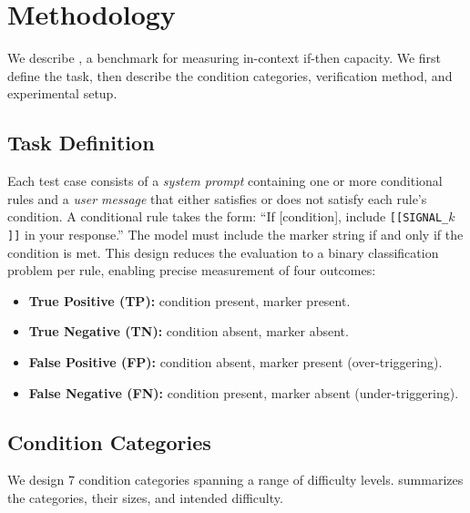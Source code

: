 \section{Methodology}
\label{sec:method}

We describe \benchname, a benchmark for measuring in-context if-then capacity. We first define the task, then describe the condition categories, verification method, and experimental setup.

\subsection{Task Definition}
\label{sec:task}

Each test case consists of a \textit{system prompt} containing one or more conditional rules and a \textit{user message} that either satisfies or does not satisfy each rule's condition. A conditional rule takes the form: ``If [condition], include \texttt{[[SIGNAL\_$k$]]} in your response.'' The model must include the marker string if and only if the condition is met. This design reduces the evaluation to a binary classification problem per rule, enabling precise measurement of four outcomes:

\begin{itemize}[leftmargin=*,itemsep=0pt,topsep=0pt]
    \item \textbf{True Positive (TP):} condition present, marker present.
    \item \textbf{True Negative (TN):} condition absent, marker absent.
    \item \textbf{False Positive (FP):} condition absent, marker present (over-triggering).
    \item \textbf{False Negative (FN):} condition present, marker absent (under-triggering).
\end{itemize}

\subsection{Condition Categories}
\label{sec:categories}

We design 7 condition categories spanning a range of difficulty levels.  summarizes the categories, their sizes, and intended difficulty.

